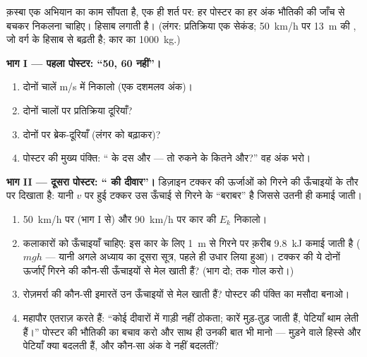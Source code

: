 \begin{problem}[{सप्ताहांत समस्या --- कक्षा क़स्बे का सड़क-सुरक्षा
अभियान बनाती है; सूत्र से जाँचे गए पोस्टर; महापौर के मुश्किल
सवाल}]\label{pb:g9:kinetic-energy-safety:1}
क़स्बा एक अभियान का काम सौंपता है, एक ही शर्त पर: हर पोस्टर का हर अंक
भौतिकी की जाँच से बचकर निकलना चाहिए।  हिसाब लगाती है। (लंगर:
प्रतिक्रिया एक सेकंड; \qty{50}{km/h} पर \qty{13}{m} की , जो
वर्ग के हिसाब से बढ़ती है; कार का  \qty{1000}{kg}.)

\medskip\noindent\textbf{भाग I --- पहला पोस्टर: ``50, 60 नहीं''।}
\begin{enumerate}
  \item दोनों चालें \unit{m/s} में निकालो (एक दशमलव अंक)।
  \item दोनों चालों पर प्रतिक्रिया दूरियाँ?
  \item दोनों पर ब्रेक-दूरियाँ (लंगर को बढ़ाकर)?
  \item पोस्टर की मुख्य पंक्ति: `` के दस  और --- तो रुकने के
        कितने  और?'' वह अंक भरो।
\end{enumerate}

\medskip\noindent\textbf{भाग II --- दूसरा पोस्टर: `` की दीवार''।}
डिज़ाइन टक्कर की ऊर्जाओं को गिरने की ऊँचाइयों के तौर पर दिखाता है:
यानी $v$  पर हुई टक्कर उस ऊँचाई से गिरने के ``बराबर'' है जिससे उतनी
ही  कमाई जाती।
\begin{enumerate}[resume]
  \item \qty{50}{km/h} पर (भाग I से) और \qty{90}{km/h} पर कार की
        $E_k$ निकालो।
  \item कलाकारों को ऊँचाइयाँ चाहिए: इस कार के लिए \qty{1}{m} से गिरने
        पर क़रीब \qty{9.8}{kJ} कमाई जाती है ($m g h$ --- यानी अगले
        अध्याय का दूसरा सूत्र, पहले ही उधार लिया हुआ)। टक्कर की ये
        दोनों ऊर्जाएँ गिरने की कौन-सी ऊँचाइयों से मेल खाती हैं? (भाग दो;
         तक गोल करो।)
  \item रोज़मर्रा की कौन-सी इमारतें उन ऊँचाइयों से मेल खाती हैं? पोस्टर
        की पंक्ति का मसौदा बनाओ।
  \item महापौर एतराज़ करते हैं: ``कोई दीवारों में गाड़ी नहीं ठोकता;
        कारें मुड़-तुड़ जाती हैं, पेटियाँ थाम लेती हैं।'' पोस्टर की
        भौतिकी का बचाव करो और साथ ही उनकी बात भी मानो --- मुड़ने वाले
        हिस्से और पेटियाँ क्या बदलती हैं, और कौन-सा अंक वे नहीं
        बदलतीं?
\end{enumerate}


\end{problem}
